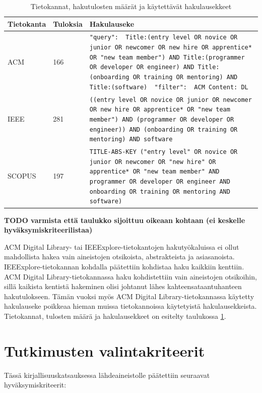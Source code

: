\documentclass[utf8]{gradu3}
\begin{document}
\begin{table}[h]
    \begin{tabular}{llp{}}
        \toprule
        {Tietokanta} & Tuloksia & Hakulauseke \\
        \midrule
        ACM & 166 & {\tt "query": { Title:(entry level OR novice OR junior OR newcomer OR new hire OR apprentice* OR "new team member") AND Title:(programmer OR developer OR engineer) AND Title:(onboarding OR training OR mentoring) AND Title:(software) } "filter": { ACM Content: DL }  } \\
        \midrule
        IEEE & 281 & {\tt ((entry level OR novice OR junior OR newcomer OR new hire OR apprentice* OR "new team member") AND (programmer OR  developer OR engineer)) AND (onboarding OR training OR mentoring) AND software } \\
        \midrule
        SCOPUS & 197 & {\tt TITLE-ABS-KEY ("entry level"  OR  novice  OR  junior  OR  newcomer OR "new hire"  OR  apprentice* OR "new team member"  AND  programmer  OR  developer  OR  engineer  AND  onboarding  OR  training  OR  mentoring  AND  software)  } \\
        \bottomrule
    \end{tabular}  
    \caption{Tietokannat, hakutulosten määrät ja käytettävät hakulausekkeet}
    \label{tbl:tietokannat}
\end{table}

\textbf{TODO varmista että taulukko sijoittuu oikeaan kohtaan (ei keskelle hyväksymiskriteerilistaa)}

ACM Digital Library- tai IEEExplore-tietokantojen hakutyökaluissa ei ollut mahdollista hakea vain aineistojen otsikoista, abstrakteista ja asiasanoista. IEEExplore-tietokannan kohdalla päätettiin kohdistaa haku kaikkiin kenttiin. ACM Digital Library-tietokannassa haku kohdistettiin vain aineistojen otsikoihin, sillä kaikista kentistä hakeminen olisi johtanut lähes kahteensataantuhanteen hakutulokseen. Tämän vuoksi myös ACM Digital Library-tietokannassa käytetty hakulauseke poikkeaa hieman muissa tietokannoissa käytetyistä hakulausekkeista. Tietokannat, tulosten määrä ja hakulausekkeet on esitelty taulukossa \ref{tbl:tietokannat}.

\section{Tutkimusten valintakriteerit}

Tässä kirjallisuuskatsauksessa lähdeaineistolle päätettiin seuraavat hyväksymiskriteerit:
\end{document}
